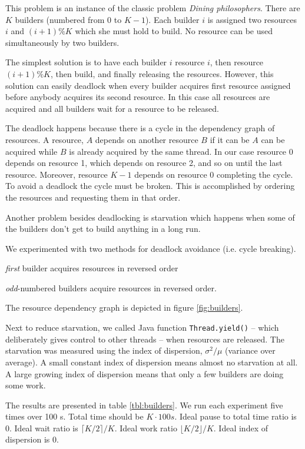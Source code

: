 \documentclass[12pt]{article}
\begin{document}
This problem is an instance of the classic problem \emph{Dining philosophers}.
There are $K$ builders (numbered from 0 to $K - 1$). Each builder $i$
is assigned two resources $i$ and $(i + 1) \% K$ which she must hold to
build. No resource can be used simultaneously by two builders.

The simplest solution is to have each builder $i$ resource $i$, then resource
$(i + 1) \% K$, then build, and finally releasing the resources. However,
this solution can easily deadlock when every builder acquires first resource
assigned before anybody acquires its second resource. In this case all
resources are acquired and all builders wait for a resource to be released.

The deadlock happens because there is a cycle in the dependency graph of
resources.  A resource, $A$ depends on another resource $B$ if it can be $A$
can be acquired while $B$ is already acquired by the same thread. In our
case resource 0 depends on resource 1, which depends on resource 2, and so
on until the last resource. Moreover, resource $K - 1$ depends on resource
0 completing the cycle. To avoid a deadlock the cycle must be broken. This
is accomplished by ordering the resources and requesting them in that order.

Another problem besides deadlocking is starvation which happens when some
of the builders don't get to build anything in a long run.

We experimented with two methods for deadlock avoidance (i.e. cycle breaking).
\begin{inparaenum}
\item \emph{first} builder acquires resources in reversed order
\item \emph{odd}-numbered builders acquire resources in reversed order.
\end{inparaenum}
The resource dependency graph is depicted in figure \ref{fig:builders}.

Next to reduce starvation, we called Java function \texttt{Thread.yield()}
-- which deliberately gives control to other threads -- when resources
are released. The starvation was measured using the index of dispersion,
$\sigma^2 / \mu$ (variance over average). A small constant index of
dispersion means almost no starvation at all. A large growing
index of dispersion means that only a few builders are doing some work.

The results are presented in table \ref{tbl:builders}.  We run each experiment
five times over 100 s. Total time should be $K \cdot 100 s$. Ideal pause to
total time ratio is 0. Ideal wait ratio is $\lceil K / 2 \rceil / K$. Ideal
work ratio $\lfloor K / 2 \rfloor / K$. Ideal index of dispersion is 0.
\end{document}
